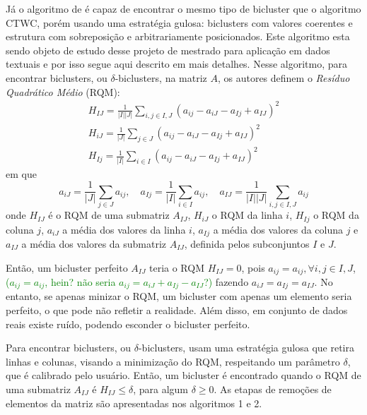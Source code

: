 \documentclass[
    12pt,                %
    oneside,            %
    a4paper,            %
    english,            %
    brazil                %
    ]{abntex2ppgsi}
\begin{document}
Já o algoritmo de  é capaz de encontrar o mesmo tipo de bicluster que o algoritmo CTWC, porém usando uma estratégia gulosa: biclusters com valores coerentes e estrutura com sobreposição e arbitrariamente posicionados. Este algoritmo esta sendo objeto de estudo desse projeto de mestrado para aplicação em dados textuais e por isso segue aqui descrito em mais detalhes.
Nesse algoritmo, para encontrar biclusters, ou $\delta$-biclusters, na matriz $A$, os autores definem o \textit{Resíduo Quadrático Médio} (RQM):
\begin{equation}
\begin{split}
    H_{IJ} = \frac{1}{|I||J|} \displaystyle\sum_{i,j \in I,J} (a_{ij} - a_{iJ} - a_{Ij} + a_{IJ})^2 \\
    H_{iJ} = \frac{1}{|J|} \displaystyle\sum_{j \in J} (a_{ij} - a_{iJ} - a_{Ij} + a_{IJ})^2 \\
    H_{Ij} = \frac{1}{|I|} \displaystyle\sum_{i \in I} (a_{ij} - a_{iJ} - a_{Ij} + a_{IJ})^2
\end{split}
\end{equation}
em que
\begin{equation}
    a_{iJ} = \frac{1}{|J|} \displaystyle\sum_{j \in J} a_{ij},\quad a_{Ij} = \frac{1}{|I|} \displaystyle\sum_{i \in I} a_{ij},\quad a_{IJ} = \frac{1}{|I||J|} \displaystyle\sum_{i,j \in I,J} a_{ij}
\end{equation}
onde $H_{IJ}$ é o RQM de uma submatriz $A_{IJ}$, $H_{iJ}$ o RQM da linha $i$, $H_{Ij}$ o RQM da coluna $j$, $a_{iJ}$ a média dos valores da linha $i$, $a_{Ij}$ a média dos valores da coluna $j$ e $a_{IJ}$ a média dos valores da submatriz $A_{IJ}$, definida pelos subconjuntos $I$ e $J$.

Então, um bicluster perfeito $A_{IJ}$ teria o RQM $H_{IJ} = 0$, pois $a_{ij} = a_{ij}, \forall i,j \in I,J$, \textcolor{green}{($a_{ij}=a_{ij}$, hein? não seria $a_{ij}=a_{iJ}+a_{Ij}-a_{IJ}$?)} fazendo $a_{iJ} = a_{Ij} = a_{IJ}$. No entanto, se apenas minizar o RQM, um bicluster com apenas um elemento seria perfeito, o que pode não refletir a realidade. Além disso, em conjunto de dados reais existe ruído, podendo esconder o bicluster perfeito.

Para encontrar biclusters, ou $\delta$-biclusters,  usam uma estratégia gulosa que retira linhas e colunas, visando a minimização do RQM, respeitando um parâmetro $\delta$, que é calibrado pelo usuário. Então, um bicluster é encontrado quando o RQM de uma submatriz $A_{IJ}$ é $H_{IJ} \leq \delta$, para algum $\delta \geq 0$. As etapas de remoções de elementos da matriz são apresentadas nos algoritmos 1 e 2.
\end{document}
